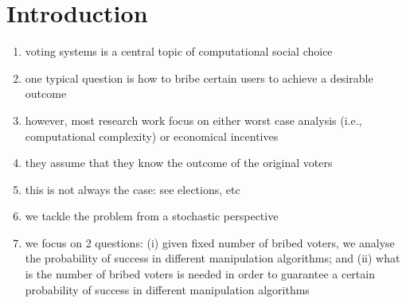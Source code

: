 
\section{Introduction}
\label{section:intro}

\noindent
\noindent
\begin{enumerate}
\item voting systems is a central topic of computational social choice
\item one typical question is how to bribe certain users to achieve a desirable outcome
\item however, most research work focus on either worst case analysis (i.e., computational complexity) or economical incentives
\item they assume that they know the outcome of the original voters
\item this is not always the case: see elections, etc
\item we tackle the problem from a stochastic perspective
\item we focus on 2 questions: (i) given fixed number of bribed voters, we analyse the probability of success in different manipulation algorithms; and (ii) what is the number of bribed voters is needed in order to guarantee a certain probability of success in different manipulation algorithms
\end{enumerate}